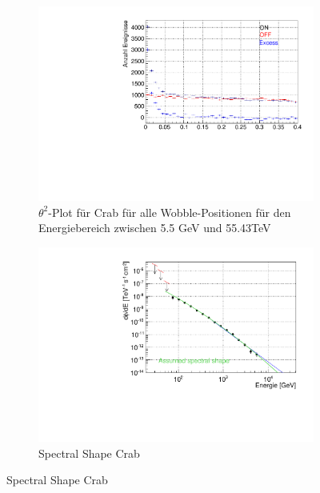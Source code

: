 \begin{figure}
  \begin{subfigure}{0.45\linewidth}
  \includegraphics[width=\textwidth]{./Plots/04_MrkAnalyse/Datenset2/Crab_Theta2.pdf}
  \caption{$\theta^2$-Plot für Crab für alle Wobble-Positionen für den Energiebereich zwischen 5.5 GeV und 55.43TeV}
  \label{Datenset2_theta^2_Crab}
  \end{subfigure}
  \hfill
  \begin{subfigure}{0.45\linewidth}
  \includegraphics[width=\textwidth]{./Plots/04_MrkAnalyse/Datenset2/Crab_dFdE.pdf}
  \caption{Spectral Shape Crab}
  \label{Datenset2_SpectralShape_Crab}

\end{subfigure}
\end{figure}
